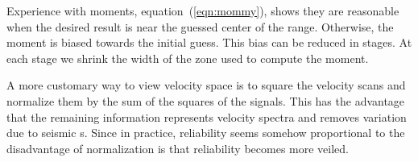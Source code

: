 \par
Experience with moments,
equation~(\ref{eqn:mommy}),
shows they are reasonable when
the desired result is near the guessed center of the range.
Otherwise, the moment is biased towards the initial guess.
This bias can be reduced in stages.
At each stage we shrink the width of the zone used to compute the moment.


A more customary way to view velocity space
is to square the velocity scans
and normalize them by the sum of the squares of the signals.
This has the advantage that the remaining information
represents velocity spectra
and removes variation due to seismic s.
Since in practice, reliability seems somehow proportional to 
the disadvantage of normalization
is that reliability becomes more veiled.

\begin{comment}
\par
An appealing visualization of velocity is shown in the right side
of Figure~\ref{fig:slowfit}.
This was prepared from the absolute value of left side,
followed by filtering spatially with an antisymmetric
leaky integral function.
(See PVI page 57).
An example is shown on the right side of Figure~\ref{fig:slowfit}.

  Left is the slowness scans.
  Right is the slowness scans after absolute value,
  smoothing a little in time,
  and antisymmetric leaky integration over slowness.
  Overlaying both is the line of slowness picks.
}
\end{comment}


%
%

